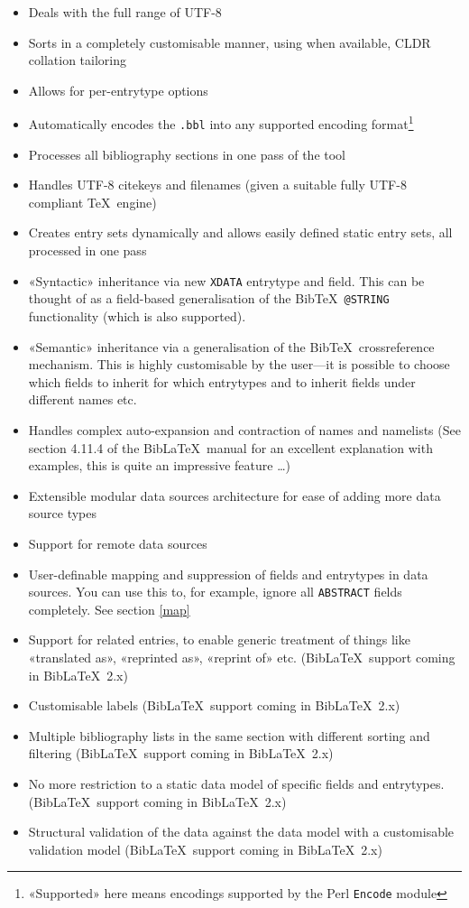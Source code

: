 \documentclass{ltxdockit}
\begin{document}
\begin{itemize}
\item Deals with the full range of UTF-8
\item Sorts in a completely customisable manner, using when available,
  CLDR collation tailoring
\item Allows for per-entrytype options
\item Automatically encodes the \verb+.bbl+ into any supported encoding
  format\footnote{«Supported» here means encodings supported by the
    Perl \texttt{Encode} module}
\item Processes all bibliography sections in one pass of the tool
\item Handles UTF-8 citekeys and filenames (given a suitable fully
  UTF-8 compliant \TeX\ engine)
\item Creates entry sets dynamically and allows easily defined static entry sets,
  all processed in one pass
\item «Syntactic» inheritance via new \verb+XDATA+ entrytype and
  field. This can be thought of as a field-based generalisation of the
  Bib\TeX\ \verb+@STRING+ functionality (which is also supported).
\item «Semantic» inheritance via a generalisation of the Bib\TeX\
  crossreference mechanism. This is highly customisable by the
  user---it is possible to choose which fields to inherit for which
  entrytypes and to inherit fields under different names etc.
\item Handles complex auto-expansion and contraction of names and
  namelists (See section 4.11.4 of the Bib\LaTeX\ manual for an excellent
  explanation with examples, this is quite an impressive feature \ldots)
\item Extensible modular data sources architecture for ease of adding
  more data source types
\item Support for remote data sources
\item User-definable mapping and suppression of fields and entrytypes in
  data sources. You can use this to, for example, ignore all
  \verb+ABSTRACT+ fields completely. See section \ref{map}
\item Support for related entries, to enable generic treatment of things
  like «translated as», «reprinted as», «reprint of»
  etc. (Bib\LaTeX\ support coming in Bib\LaTeX\ 2.x)
\item Customisable labels (Bib\LaTeX\ support coming in
  Bib\LaTeX\ 2.x)
\item Multiple bibliography lists in the same section with different
  sorting and filtering (Bib\LaTeX\ support coming in Bib\LaTeX\ 2.x)
\item No more restriction to a static data model of specific fields and
  entrytypes. (Bib\LaTeX\ support coming in Bib\LaTeX\ 2.x)
\item Structural validation of the data against the data model with a
  customisable validation model (Bib\LaTeX\ support coming in
  Bib\LaTeX\ 2.x)
\end{itemize}
\end{document}
